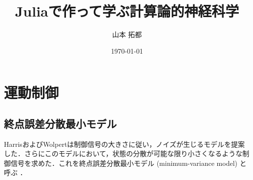 \documentclass[titlepage]{ltjsbook}
\title{\Huge \textbf{Juliaで作って学ぶ計算論的神経科学}}
\author{\huge 山本 拓都}
\date{\huge \today}
\begin{document}
\setcounter{tocdepth}{2}
\tableofcontents
\clearpage
\chapter{運動制御}
\section{終点誤差分散最小モデル}
HarrisおよびWolpertは制御信号の大きさに従い，ノイズが生じるモデルを提案した．さらにこのモデルにおいて，状態の分散が可能な限り小さくなるような制御信号を求めた．これを終点誤差分散最小モデル (minimum-variance model) と呼ぶ \citep{Harris1998-gj}．
\end{document}
